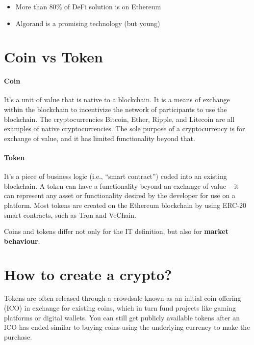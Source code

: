 \begin{itemize}
    \item More than 80\% of DeFi solution is on Ethereum
    \item Algorand is a promising technology (but young)
\end{itemize}



\section{Coin vs Token}

\paragraph{Coin} It's a unit of value that is native to a blockchain. It is a means of exchange within the blockchain to incentivize the network of participants to use the blockchain. The cryptocurrencies Bitcoin, Ether, Ripple, and Litecoin are all examples of native cryptocurrencies. The sole purpose of a cryptocurrency is for exchange of value, and it has limited functionality beyond that.

\paragraph{Token} It's a piece of business logic (i.e., ``smart contract'') coded into an existing blockchain. A token can have a functionality beyond an exchange of value -- it can represent any asset or functionality desired by the developer for use on a platform. Most tokens are created on the Ethereum blockchain by using ERC-20 smart contracts, such as Tron and VeChain.

Coins and tokens differ not only for the IT definition, but also for \textbf{market behaviour}.

\section{How to create a crypto?}

Tokens are often released through a crowdsale known as an initial coin offering (ICO) in exchange for existing coins, which in turn fund projects like gaming platforms or digital wallets. You can still get publicly available tokens after an ICO has ended-similar to buying coins-using the underlying currency to make the purchase.

